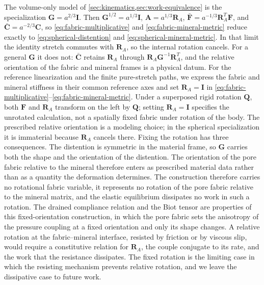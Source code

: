 The volume-only model of \cref{sec:kinematics,sec:work-equivalence} is the
specialization
\(\mathbf G=a^{2/3}\mathbf I\). Then
\(\mathbf G^{1/2}=a^{1/3}\mathbf I\),
\(\mathbf A=a^{1/3}\mathbf R_A\),
\(\bar{\mathbf F}=a^{-1/3}\mathbf R_A^T\mathbf F\), and
\(\bar{\mathbf C}=a^{-2/3}\mathbf C\), so
\eqref{eq:fabric-multiplicative} and
\eqref{eq:fabric-mineral-metric} reduce exactly to
\eqref{eq:spherical-distention} and
\eqref{eq:spherical-mineral-metric}. In that limit the identity stretch
commutes with \(\mathbf R_A\), so the internal rotation cancels. For a
general \(\mathbf G\) it does not: \(\bar{\mathbf C}\) retains
\(\mathbf R_A\) through \(\mathbf R_A\mathbf G^{-1}\mathbf R_A^T\), and
the relative orientation of the fabric and mineral frames is a physical
datum. For the reference linearization and the finite pure-stretch paths,
we express the fabric and mineral stiffness in their common reference
axes and set \(\mathbf R_A=\mathbf I\) in
\eqref{eq:fabric-multiplicative}--\eqref{eq:fabric-mineral-metric}. Under a superposed rigid rotation \(\mathbf Q\), both \(\mathbf F\) and
\(\mathbf R_A\) transform on the left by \(\mathbf Q\); setting
\(\mathbf R_A=\mathbf I\) specifies the unrotated calculation, not a
spatially fixed fabric under rotation of the body. The prescribed relative
orientation is a modeling choice; in the spherical specialization it is immaterial
because \(\mathbf R_A\) cancels there. Fixing the rotation has three
consequences. The distention is symmetric in the material frame, so
\(\mathbf G\) carries both the shape and the orientation of the
distention. The orientation of the pore fabric relative to the mineral
therefore enters as prescribed material data rather than as a quantity
the deformation determines. The construction therefore carries no rotational
fabric variable, it represents no rotation of the pore fabric relative to
the mineral matrix, and the elastic equilibrium dissipates no work in such a
rotation. The drained compliance relation and the Biot tensor are
properties of this fixed-orientation construction, in which the pore
fabric sets the anisotropy of the pressure coupling at a fixed
orientation and only its shape changes. A relative rotation at the
fabric--mineral interface, resisted by friction or by viscous slip, would
require a constitutive relation for \(\mathbf R_A\), the couple conjugate
to its rate, and the work that the resistance dissipates. The fixed
rotation is the limiting case in which the resisting mechanism prevents
relative rotation, and we leave the dissipative case to future work.

